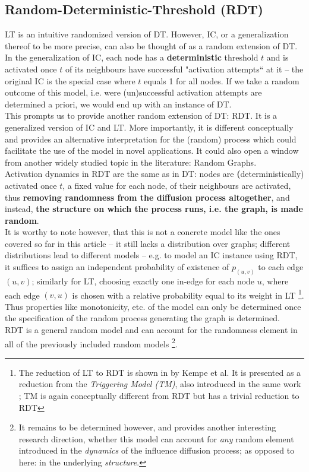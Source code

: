 \documentclass[twocolumn, 10pt]{article}
\begin{document}
\subsection{Random-Deterministic-Threshold (RDT)}
LT is an intuitive randomized version of DT. However, IC, or a generalization thereof to be more precise, can also be thought of as a random extension of DT. In the generalization of IC, each node has a \textbf{deterministic} threshold $t$ and is activated once $t$ of its neighbours have successful "activation attempts`` at it -- the original IC is the special case where $t$ equals 1 for all nodes. If we take a random outcome of this model, i.e. were (un)successful activation attempts are determined a priori, we would end up with an instance of DT. \\
This prompts us to provide another random extension of DT: RDT. It is a generalized version of IC and LT. More importantly, it is different conceptually and provides an alternative interpretation for the (random) process which could facilitate the use of the model in novel applications. It could also open a window from another widely studied topic in the literature: Random Graphs. \\
Activation dynamics in RDT are the same as in DT: nodes are \textbf(deterministically) activated once $t$, a fixed value for each node, of their neighbours are activated, thus \textbf{removing randomness from the diffusion process altogether}, and instead, \textbf{the structure on which the process runs, i.e. the graph, is made random}.  \\
It is worthy to note however, that this is not a concrete model like the ones covered so far in this article -- it still lacks a distribution over graphs; different distributions lead to different models -- e.g. to model an IC instance using RDT, it suffices to assign an independent probability of existence of $p_{(u, v)}$ to each edge $(u, v)$; similarly for LT, choosing exactly one in-edge for each node $u$, where each edge $(v, u)$ is chosen with a relative probability equal to its weight in LT \footnote{The reduction of LT to RDT is shown in \cite{kempe} by Kempe et al. It is presented as a reduction from the \textit{Triggering Model (TM)}, also introduced in the same work ; TM is again conceptually different from RDT but has a trivial reduction to RDT}. Thus properties like monotonicity, etc. of the model can only be determined once the specification of the random process generating the graph is determined. \\
RDT is a general random model and can account for the randomness element in all of the previously included random models \footnote{It remains to be determined however, and provides another interesting research direction, whether this model can account for \textit{any} random element introduced in the \textit{dynamics} of the influence diffusion process; as opposed to here: in the underlying \textit{structure}.}.
\end{document}
